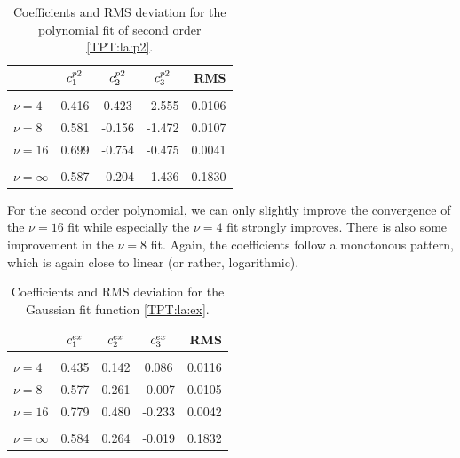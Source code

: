 \documentclass[8.5pt,twoside,twocolumn]{article}
\theoremstyle{standard}
\begin{document}
\begin{table}[h]
  \centering
  \caption{Coefficients and RMS deviation for the polynomial fit of second order \eqref{TPT:la:p2}.}
    \begin{tabular}{l | ccc | r}
         & $c^{p2}_1$ & $c^{p2}_2$ & $c^{p2}_3$  & RMS \\[2pt]
    \hline
    & & &\\[-.25cm]
    $\nu=4$ & 0.416 & 0.423 & -2.555 & 0.0106\\
    $\nu=8$ & 0.581  & -0.156 & -1.472 & 0.0107\\
    $\nu=16$ & 0.699 &  -0.754 & -0.475 & 0.0041\\[2pt] \hline
    & & & \\[-.32cm]
    $\nu=\infty$ &  0.587 &-0.204 & -1.436 & 0.1830\\[2pt]
    \hline
    \end{tabular}%
    \label{TPT:tableP2}
\end{table}%
For the second order polynomial, we can only slightly improve the convergence of the $\nu=16$
fit while especially the $\nu=4$ fit strongly improves. There is also some improvement in the
$\nu=8$ fit. Again, the coefficients follow a monotonous pattern, which is again
close to linear (or rather, logarithmic). 

\begin{table}[h]
  \centering
  \caption{Coefficients and RMS deviation for the Gaussian fit function \eqref{TPT:la:ex}.}
    \begin{tabular}{l | ccc | r}
         & $c^{ex}_1$ & $c^{ex}_2$ & $c^{ex}_3$  & RMS \\[2pt]
    \hline
    & & &\\[-.25cm]
    $\nu=4$ & 0.435 & 0.142 & 0.086 & 0.0116 \\
    $\nu=8$ & 0.577 & 0.261 & -0.007 & 0.0105\\
    $\nu=16$ & 0.779 & 0.480 & -0.233 & 0.0042\\[2pt] \hline
    & & & \\[-.32cm]
    $\nu=\infty$ &  0.584 & 0.264 & -0.019 & 0.1832\\[2pt]
    \hline
    \end{tabular}%
    \label{TPT:tableGauss}
\end{table}%
\end{document}
